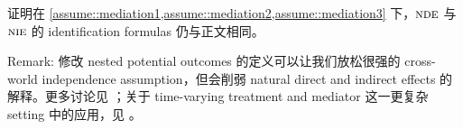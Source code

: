 证明在 \cref{assume::mediation1,assume::mediation2,assume::mediation3} 下，$\textsc{nde}$ 与 $\textsc{nie}$ 的 identification formulas 仍与正文相同。



Remark: 修改 nested potential outcomes 的定义可以让我们放松很强的 cross-world independence assumption，但会削弱 natural direct and indirect effects 的解释。更多讨论见 \citet{vanderweele2015explanation}；关于 time-varying treatment and mediator 这一更复杂 setting 中的应用，见 \citet{vanderweele2017mediation}。

  
  
 
